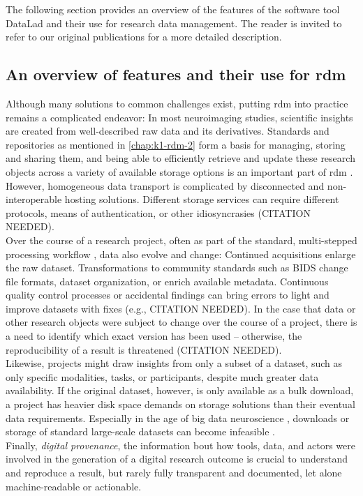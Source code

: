 The following section provides an overview of the features of the software tool DataLad and their use for research data management.
The reader is invited to refer to our original publications \citep{Halchenko2021} \citep{wagner2020datalad} for a more detailed description.

\subsection{An overview of features and their use for \gls{rdm}}

Although many solutions to common challenges exist, putting \gls{rdm} into practice remains a complicated endeavor:
In most neuroimaging studies, scientific insights are created from well-described raw data and its derivatives.
Standards and repositories as mentioned in \cref{chap:k1-rdm-2} form a basis for managing, storing and sharing them, and being able to efficiently retrieve and update these research objects across a variety of available storage options is an important part of \gls{rdm} \citep{borghi2018data}.
However, homogeneous data transport is complicated by disconnected and non-interoperable hosting solutions.
Different storage services can require different protocols, means of authentication, or other idiosyncrasies (CITATION NEEDED). \\
Over the course of a research project, often as part of the standard, multi-stepped processing workflow \citep{poline2011}, data also evolve and change:
Continued acquisitions enlarge the raw dataset.
Transformations to community standards such as \gls{BIDS} \citep{gorgolewski2016brain} change file formats, dataset organization, or enrich available metadata.
Continuous quality control processes or accidental findings can bring errors to light and improve datasets with fixes (e.g., CITATION NEEDED).
In the case that data or other research objects were subject to change over the course of a project, there is a need to identify which exact version has been used -- otherwise, the reproducibility of a result is threatened (CITATION NEEDED). \\
Likewise, projects might draw insights from only a subset of a dataset, such as only specific modalities, tasks, or participants, despite much greater data availability.
If the original dataset, however, is only available as a bulk download, a project has heavier disk space demands on storage solutions than their eventual data requirements.
Especially in the age of big data neuroscience \citep{bzdok2017inference}, downloads or storage of standard large-scale datasets can become infeasible \citep{horien2021hitchhiker} \citep{grisham2016proposed}. \\
Finally, \textit{digital provenance}, the information bout how tools, data, and actors were involved in the generation of a digital research outcome is crucial to understand and reproduce a result, but rarely fully transparent and documented, let alone machine-readable or actionable.


